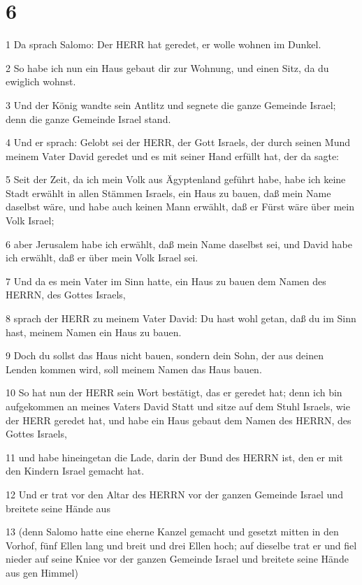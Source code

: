 \chapter{6}

\par 1 Da sprach Salomo: Der HERR hat geredet, er wolle wohnen im Dunkel.
\par 2 So habe ich nun ein Haus gebaut dir zur Wohnung, und einen Sitz, da du ewiglich wohnst.
\par 3 Und der König wandte sein Antlitz und segnete die ganze Gemeinde Israel; denn die ganze Gemeinde Israel stand.
\par 4 Und er sprach: Gelobt sei der HERR, der Gott Israels, der durch seinen Mund meinem Vater David geredet und es mit seiner Hand erfüllt hat, der da sagte:
\par 5 Seit der Zeit, da ich mein Volk aus Ägyptenland geführt habe, habe ich keine Stadt erwählt in allen Stämmen Israels, ein Haus zu bauen, daß mein Name daselbst wäre, und habe auch keinen Mann erwählt, daß er Fürst wäre über mein Volk Israel;
\par 6 aber Jerusalem habe ich erwählt, daß mein Name daselbst sei, und David habe ich erwählt, daß er über mein Volk Israel sei.
\par 7 Und da es mein Vater im Sinn hatte, ein Haus zu bauen dem Namen des HERRN, des Gottes Israels,
\par 8 sprach der HERR zu meinem Vater David: Du hast wohl getan, daß du im Sinn hast, meinem Namen ein Haus zu bauen.
\par 9 Doch du sollst das Haus nicht bauen, sondern dein Sohn, der aus deinen Lenden kommen wird, soll meinem Namen das Haus bauen.
\par 10 So hat nun der HERR sein Wort bestätigt, das er geredet hat; denn ich bin aufgekommen an meines Vaters David Statt und sitze auf dem Stuhl Israels, wie der HERR geredet hat, und habe ein Haus gebaut dem Namen des HERRN, des Gottes Israels,
\par 11 und habe hineingetan die Lade, darin der Bund des HERRN ist, den er mit den Kindern Israel gemacht hat.
\par 12 Und er trat vor den Altar des HERRN vor der ganzen Gemeinde Israel und breitete seine Hände aus
\par 13 (denn Salomo hatte eine eherne Kanzel gemacht und gesetzt mitten in den Vorhof, fünf Ellen lang und breit und drei Ellen hoch; auf dieselbe trat er und fiel nieder auf seine Kniee vor der ganzen Gemeinde Israel und breitete seine Hände aus gen Himmel)
